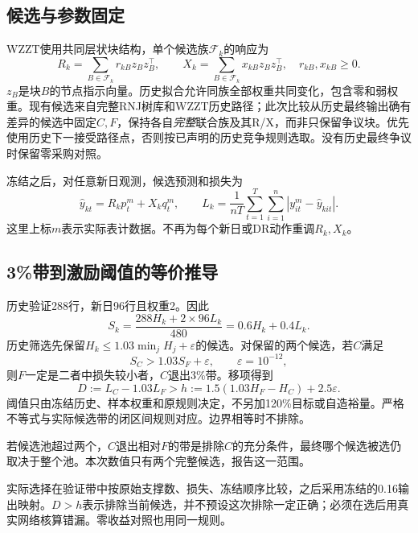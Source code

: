 \documentclass[UTF8,a4paper,11pt]{ctexart}
\begin{document}
\subsection{候选与参数固定}
WZZT使用共同层状块结构，单个候选族$\mathcal F_k$的响应为
\begin{equation}
 R_k=\sum_{B\in\mathcal F_k}r_{kB}z_Bz_B^\top,
 \qquad X_k=\sum_{B\in\mathcal F_k}x_{kB}z_Bz_B^\top,
 \quad r_{kB},x_{kB}\geq0.
\end{equation}
$z_B$是块$B$的节点指示向量。历史拟合允许同族全部权重共同变化，包含零和弱权重。现有候选来自完整RNJ树库和WZZT历史路径；此次比较从历史最终输出确有差异的候选中固定$C,F$，保持各自\emph{完整}联合族及其R/X，而非只保留争议块。优先使用历史下一接受路径点，否则按已声明的历史竞争规则选取。没有历史最终争议时保留零采购对照。

冻结之后，对任意新日观测，候选预测和损失为
\begin{equation}
 \widehat y_{kt}=R_kp_t^m+X_kq_t^m,
 \qquad L_k=\frac1{nT}\sum_{t=1}^{T}\sum_{i=1}^{n}|y_{it}^m-\widehat y_{kit}|.
 \label{eq:loss}
\end{equation}
这里上标$m$表示实际表计数据。不再为每个新日或DR动作重调$R_k,X_k$。

\subsection{3\%带到激励阈值的等价推导}
历史验证288行，新日96行且权重2。因此
\begin{equation}
 S_k=\frac{288H_k+2\times96L_k}{480}=0.6H_k+0.4L_k.
\end{equation}
历史筛选先保留$H_k\leq1.03\min_jH_j+\varepsilon$的候选。对保留的两个候选，若$C$满足
\begin{equation}
 S_C>1.03S_F+\varepsilon,\qquad\varepsilon=10^{-12},
\end{equation}
则$F$一定是二者中损失较小者，$C$退出3\%带。移项得到
\begin{equation}
 \boxed{D:=L_C-1.03L_F>h:=1.5(1.03H_F-H_C)+2.5\varepsilon.}\label{eq:threshold}
\end{equation}
阈值只由冻结历史、样本权重和原规则决定，不另加120\%目标或自造裕量。严格不等式与实际候选带的闭区间规则对应。边界相等时不排除。

若候选池超过两个，$C$退出相对$F$的带是排除$C$的充分条件，最终哪个候选被选仍取决于整个池。本次数值只有两个完整候选，报告这一范围。

实际选择在验证带中按原始支撑数、损失、冻结顺序比较，之后采用冻结的0.16输出映射。$D>h$表示排除当前候选，并不预设这次排除一定正确；必须在选后用真实网络核算错漏。零收益对照也用同一规则。
\end{document}
